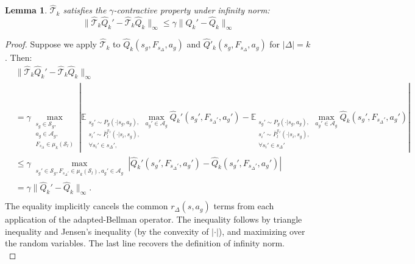 \documentclass{article}
\theoremstyle{plain}
\newtheorem{lemma}[theorem]{Lemma}
\theoremstyle{definition}
\begin{document}
\begin{lemma}\label{lemma: gamma-contraction of adapted Bellman operator}
{$\hat{\mathcal{T}}_k$ satisfies the $\gamma$-contractive property under infinity norm:}
    \[\|\hat{\mathcal{T}}_k\hat{Q}_k' - \hat{\mathcal{T}}_k\hat{Q}_k\|_\infty \leq \gamma \|\hat{Q}_k' - \hat{Q}_k\|_\infty\]
\end{lemma}
\begin{proof} Suppose we apply $\hat{\mathcal{T}}_k$ to $\hat{Q}_k(s_g,F_{s_\Delta}, a_g)$ and $\hat{Q}'_k(s_g, F_{s_\Delta}, a_g)$ for $|\Delta|=k$. Then:
\begin{align*}
&\|\hat{\mathcal{T}}_k\hat{Q}_k'- \hat{\mathcal{T}}_k\hat{Q}_k\|_\infty \\
&= \gamma \max_{\substack{s_g\in \mathcal{S}_g,\\ a_g\in\mathcal{A}_g,\\ F_{s_\Delta} \in \mu_k{(\mathcal{S}_l)}}}\!\left| \mathbb{E}_{\substack{s_g'\sim P_g(\cdot|s_g,a_g),\\ s_i'\sim \bar{P}^{\pi_\ell}_l(\cdot|s_i, s_g),\\ \forall s_i'\in s_\Delta',\\ }}\max_{a_g'\in\mathcal{A}_g}\hat{Q}_k'(s_g', F_{s_\Delta'}, a_g')- \mathbb{E}_{\substack{s_g'\sim P_g(\cdot|s_g,a_g),\\ s_i'\sim \bar{P}^{\pi_\ell}_l(\cdot|s_i, s_g),\\\forall s_i'\in s_\Delta'
}}\max_{a_g'\in\mathcal{A}_g}\hat{Q}_k(s_g', F_{s_\Delta'}, a_g')\right|\\
    &\leq \gamma  \max_{\substack{s_g' \in \mathcal{S}_g, F_{s_\Delta'} \in \mu_k{(\mathcal{S}_l)}, a_g'\in\mathcal{A}_g
        }}\left| \hat{Q}_k'(s_g', F_{s_\Delta'}, a_g') -  \hat{Q}_k(s_g', F_{s_\Delta'}, a_g')\right| \\
        &= \gamma \|\hat{Q}_k' - \hat{Q}_k\|_\infty.\\
    \end{align*}
The equality implicitly cancels the common $r_\Delta(s, a_g)$ terms from each application of the adapted-Bellman operator. The inequality follows by triangle inequality and Jensen's inequality (by the convexity of $|\cdot|$), and maximizing over the random variables. The last line recovers the definition of infinity norm. \qedhere\\
\end{proof}
 
\end{document}

